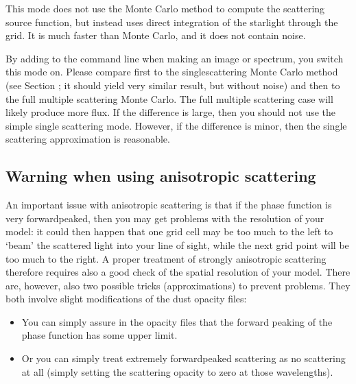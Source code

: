 \documentclass[letterpaper,10pt,english]{sphinxmanual}
\begin{document}
This mode does not use the Monte Carlo method to compute the scattering source
function, but instead uses direct integration of the starlight through the
grid. It is much faster than Monte Carlo, and it does not contain noise.

By adding  to the command line when making an image or spectrum,
you switch this mode on. Please compare first to the single\sphinxhyphen{}scattering Monte
Carlo method (see Section {\hyperref[\detokenize{dustradtrans:sec-single-multiple-scattering}]{}}; it should yield
very similar result, but without noise) and then to the full multiple scattering
Monte Carlo. The full multiple scattering case will likely produce more flux. If
the difference is large, then you should not use the simple single scattering
mode. However, if the difference is minor, then the single scattering
approximation is reasonable.


\subsection{Warning when using an\sphinxhyphen{}isotropic scattering}
\label{\detokenize{dustradtrans:warning-when-using-an-isotropic-scattering}}
An important issue with anisotropic scattering is that if the phase function is
very forward\sphinxhyphen{}peaked, then you may get problems with the  resolution
of your model: it could then happen that one grid cell may be too much to the
left to ‘beam’ the scattered light into your line of sight, while the next grid
point will be too much to the right. A proper treatment of strongly anisotropic
scattering therefore requires also a good check of the spatial resolution of
your model. There are, however, also two possible tricks (approximations) to
prevent problems. They both involve slight modifications of the dust opacity
files:
\begin{itemize}
\item {} 
You can simply assure in the opacity files that the forward peaking of
the phase function has some upper limit.

\item {} 
Or you can simply treat extremely forward\sphinxhyphen{}peaked scattering as no
scattering at all (simply setting the scattering opacity to zero at those
wavelengths).

\end{itemize}
\end{document}
